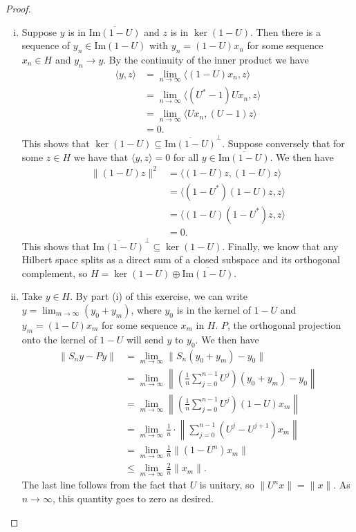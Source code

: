 \documentclass[11pt,letterpaper]{report}
\newcommand{\im}[1]{\text{Im}\left({#1}\right)}
\begin{document}
\begin{proof}
	\begin{enumerate}[(i)]
		\item Suppose $y$ is in $\overline{\im{1-U}}$ and $z$ is in $\ker(1-U)$. Then there is a sequence of $y_n\in \im{1-U}$ with $y_n = (1-U)x_n$ for some sequence $x_n\in H$ and $y_n\to y$. By the continuity of the inner product we have
		\begin{align*}
			\langle y, z\rangle &= \lim_{n\to \infty}\langle (1-U)x_n, z\rangle\\
			&= \lim_{n\to \infty}\langle (U^*-1)U x_n, z\rangle\\
			&= \lim_{n\to \infty}\langle Ux_n, (U-1)z\rangle\\
			&= 0.
		\end{align*}
		This shows that $\ker(1-U)\subseteq \overline{\im{1-U}}^\perp$. Suppose conversely that for some $z\in H$ we have that $\langle y, z\rangle = 0$ for all $y\in \overline{\im{1-U}}$. We then have
		\begin{align*}
			\|(1-U)z\|^2 &= \langle (1-U)z, (1-U)z\rangle\\
			&= \langle (1-U^*)(1-U)z, z\rangle\\
			&= \langle (1-U)(1-U^*)z, z\rangle\\
			&= 0.
		\end{align*}
		This shows that $\overline{\im{1-U}}^\perp \subseteq \ker(1-U)$. Finally, we know that any Hilbert space splits as a direct sum of a closed subspace and its orthogonal complement, so $H = \ker(1-U)\oplus \overline{\im{1-U}}$. 

		\item Take $y\in H$. By part (i) of this exercise, we can write $y = \lim_{m\to \infty}(y_0 + y_m)$, where $y_0$ is in the kernel of $1-U$ and $y_m = (1-U)x_m$ for some sequence $x_m$ in $H$. $P$, the orthogonal projection onto the kernel of $1-U$ will send $y$ to $y_0$. We then have
		\begin{align*}
			\|S_ny - Py\| &= \lim_{m\to \infty}\|S_n(y_0 + y_m) - y_0\|\\
			&= \lim_{m\to \infty}\left\|\left(\frac{1}{n}\sum_{j=0}^{n-1}U^j\right)(y_0+y_m) - y_0\right\|\\
			&= \lim_{m\to \infty}\left\|\left(\frac{1}{n}\sum_{j=0}^{n-1}U^j\right)(1-U)x_m\right\|\\
			&= \lim_{m\to \infty}\frac{1}{n}\cdot \left\|\sum_{j=0}^{n-1} (U^j - U^{j+1})x_m\right\|\\
			&= \lim_{m\to \infty}\frac{1}{n}\|(1-U^n)x_m\|\\
			&\leq \lim_{m\to \infty}\frac{2}{n}\|x_m\|.
		\end{align*}
		The last line follows from the fact that $U$ is unitary, so $\|U^nx\| = \|x\|$. As $n\to \infty$, this quantity goes to zero as desired. 
	\end{enumerate}
\end{proof}
\end{document}
